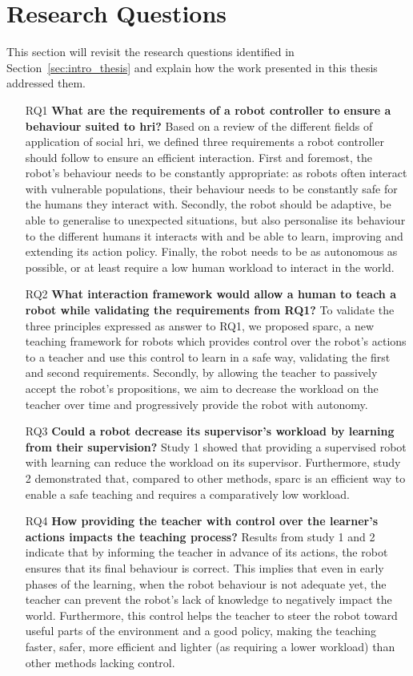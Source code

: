 \section{Research Questions}
This section will revisit the research questions identified in Section~\ref{sec:intro_thesis} and explain how the work presented in this thesis addressed them.
\begin{itemize}
\item [RQ1] \textbf{What are the requirements of a robot controller to ensure a behaviour suited to \gls{hri}?} 
Based on a review of the different fields of application of social \gls{hri}, we defined three requirements a robot controller should follow to ensure an efficient interaction. First and foremost, the robot's behaviour needs to be constantly appropriate: as robots often interact with vulnerable populations, their behaviour needs to be constantly safe for the humans they interact with. Secondly, the robot should be adaptive, be able to generalise to unexpected situations, but also personalise its behaviour to the different humans it interacts with and be able to learn, improving and extending its action policy. Finally, the robot needs to be as autonomous as possible, or at least require a low human workload to interact in the world.

\item [RQ2] \textbf{What interaction framework would allow a human to teach a robot while validating the requirements from RQ1?}
To validate the three principles expressed as answer to RQ1, we proposed \gls{sparc}, a new teaching framework for robots which provides control over the robot's actions to a teacher and use this control to learn in a safe way, validating the first and second requirements. Secondly, by allowing the teacher to passively accept the robot's propositions, we aim to decrease the workload on the teacher over time and progressively provide the robot with autonomy. 

\item [RQ3] \textbf{Could a robot decrease its supervisor's workload by learning from their supervision?}
Study 1 showed that providing a supervised robot with learning can reduce the workload on its supervisor. Furthermore, study 2 demonstrated that, compared to other methods, \gls{sparc} is an efficient way to enable a safe teaching and requires a comparatively low workload.

\item [RQ4] \textbf{How providing the teacher with control over the learner's actions impacts the teaching process?} 
Results from study 1 and 2 indicate that by informing the teacher in advance of its actions, the robot ensures that its final behaviour is correct. This implies that even in early phases of the learning, when the robot behaviour is not adequate yet, the teacher can prevent the robot's lack of knowledge to negatively impact the world. Furthermore, this control helps the teacher to steer the robot toward useful parts of the environment and a good policy, making the teaching faster, safer, more efficient and lighter (as requiring a lower workload) than other methods lacking control.


\end{itemize}
